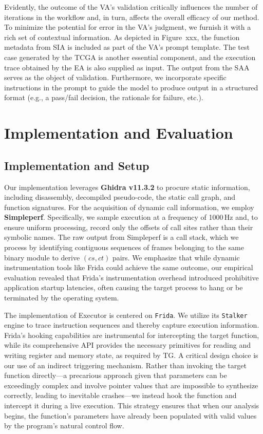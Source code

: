 \documentclass[acmsmall,screen,review,anonymous]{acmart} %
\begin{document}
Evidently, the outcome of the VA's validation critically influences the number of iterations in the workflow and, in turn, affects the overall efficacy of our method. To minimize the potential for error in the VA's judgment, we furnish it with a rich set of contextual information. As depicted in Figure~xxx, the function metadata from SIA is included as part of the VA's prompt template. The test case generated by the TCGA is another essential component, and the execution trace obtained by the EA is also supplied as input. The output from the SAA serves as the object of validation. Furthermore, we incorporate specific instructions in the prompt to guide the model to produce output in a structured format (e.g., a pass/fail decision, the rationale for failure, etc.).



\section{Implementation and Evaluation}

\subsection{Implementation and Setup}

Our implementation leverages \textbf{Ghidra v11.3.2} to procure static information, including disassembly, decompiled pseudo-code, the static call graph, and function signatures. For the acquisition of dynamic call information, we employ \textbf{Simpleperf}. Specifically, we sample execution at a frequency of 1000\,Hz and, to ensure uniform processing, record only the offsets of call sites rather than their symbolic names. The raw output from Simpleperf is a call stack, which we process by identifying contiguous sequences of frames belonging to the same binary module to derive \((cs, ct)\) pairs. We emphasize that while dynamic instrumentation tools like Frida could achieve the same outcome, our empirical evaluation revealed that Frida's instrumentation overhead introduced prohibitive application startup latencies, often causing the target process to hang or be terminated by the operating system.

The implementation of Executor is centered on \texttt{Frida}. We utilize its \texttt{Stalker} engine to trace instruction sequences and thereby capture execution information. Frida's hooking capabilities are instrumental for intercepting the target function, while its comprehensive API provides the necessary primitives for reading and writing register and memory state, as required by TG. A critical design choice is our use of an indirect triggering mechanism. Rather than invoking the target function directly---a precarious approach given that parameters can be exceedingly complex and involve pointer values that are impossible to synthesize correctly, leading to inevitable crashes---we instead hook the function and intercept it during a live execution. This strategy ensures that when our analysis begins, the function's parameters have already been populated with valid values by the program's natural control flow.
\end{document}
